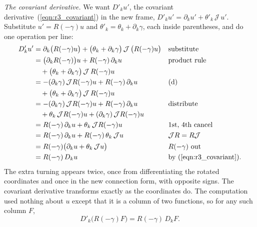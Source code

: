 \emph{The covariant derivative.} We want $D'_ku'$, the covariant derivative~(\ref{eqn:r3_covariant}) in the new frame, $D'_ku' = \partial_ku' + \theta'_k\,\mathcal J\,u'$. Substitute $u' = R(-\gamma)u$ and $\theta'_k = \theta_k + \partial_k\gamma$, each inside parentheses, and do one operation per line:
\begin{align*}
D'_ku' &= \partial_k\big(R(-\gamma)u\big) + \big(\theta_k + \partial_k\gamma\big)\,\mathcal J\, \big(R(-\gamma)u\big) && \text{substitute} \\
&= \big(\partial_k R(-\gamma)\big)u + R(-\gamma)\,\partial_ku && \text{product rule} \\
&\quad + \big(\theta_k + \partial_k\gamma\big)\,\mathcal J\, R(-\gamma)u \\
&= -(\partial_k\gamma)\,\mathcal J R(-\gamma)u + R(-\gamma)\,\partial_ku && \text{(d)} \\
&\quad + \big(\theta_k + \partial_k\gamma\big)\,\mathcal J\, R(-\gamma)u \\
&= -(\partial_k\gamma)\,\mathcal J R(-\gamma)u + R(-\gamma)\,\partial_ku && \text{distribute} \\
&\quad + \theta_k\,\mathcal J R(-\gamma)u + (\partial_k\gamma)\,\mathcal J R(-\gamma)u \\
&= R(-\gamma)\,\partial_ku + \theta_k\,\mathcal J R(-\gamma)u && \text{1st, 4th cancel} \\
&= R(-\gamma)\,\partial_ku + R(-\gamma)\,\theta_k\,\mathcal J u && \mathcal J R = R\mathcal J \\
&= R(-\gamma)\big(\partial_ku + \theta_k\,\mathcal J u\big) && R(-\gamma) \text{ out} \\
&= R(-\gamma)\, D_ku && \text{by (\ref{eqn:r3_covariant}).}
\end{align*}
The extra turning appears twice, once from differentiating the rotated coordinates and once in the new connection form, with opposite signs. The covariant derivative transforms exactly as the coordinates do. The computation used nothing about $u$ except that it is a column of two functions, so for any such column $F$,
\begin{equation}
\label{eqn:s3a_DF}
D'_k\big(R(-\gamma)F\big) = R(-\gamma)\, D_k F .
\end{equation}

